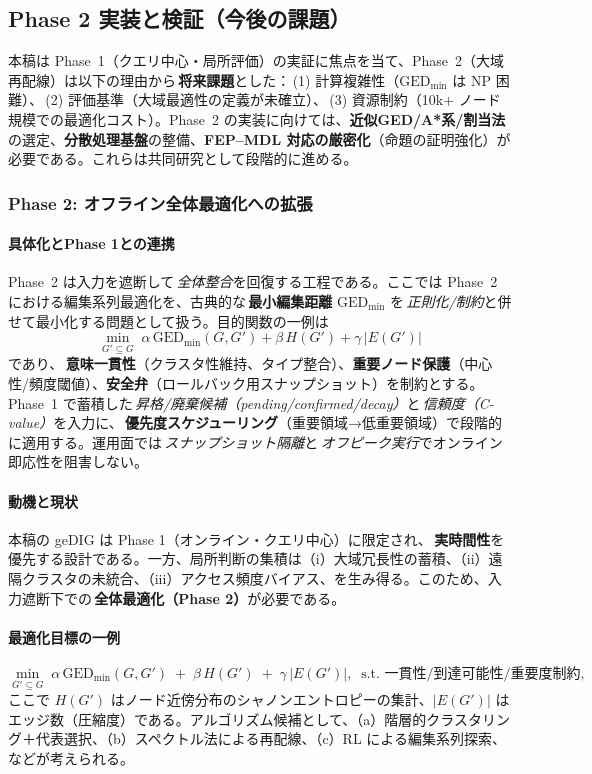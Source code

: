\documentclass[ja=standard,xelatex]{bxjsarticle}
\begin{document}
\subsection{Phase 2 実装と検証（今後の課題）}
本稿は Phase~1（クエリ中心・局所評価）の実証に焦点を当て、Phase~2（大域再配線）は以下の理由から\,\textbf{将来課題}とした：\,(1) 計算複雑性（$\mathrm{GED}_{\min}$ は NP 困難）、\,(2) 評価基準（大域最適性の定義が未確立）、\,(3) 資源制約（10k+ ノード規模での最適化コスト）。Phase~2 の実装に向けては、\textbf{近似GED/A*系/割当法}の選定、\textbf{分散処理基盤}の整備、\textbf{FEP–MDL 対応の厳密化}（命題の証明強化）が必要である。これらは共同研究として段階的に進める。

\subsubsection{Phase 2: オフライン全体最適化への拡張}
\label{sec:phase2_offline}
\paragraph{具体化とPhase 1との連携}
Phase~2 は入力を遮断して\,\emph{全体整合}を回復する工程である。ここでは Phase~2 における編集系列最適化を、古典的な\,\textbf{最小編集距離} $\mathrm{GED}_{\min}$ を\,\emph{正則化/制約}と併せて最小化する問題として扱う。目的関数の一例は
\[\min_{G'\subseteq G}\; \alpha\,\mathrm{GED}_{\min}(G,G')+\beta\,H(G')+\gamma\,|E(G')|\]
であり、\,\textbf{意味一貫性}（クラスタ性維持、タイプ整合）、\textbf{重要ノード保護}（中心性/頻度閾値）、\textbf{安全弁}（ロールバック用スナップショット）を制約とする。Phase~1 で蓄積した\,\emph{昇格/廃棄候補（pending/confirmed/decay）}と\,\emph{信頼度（C-value）}を入力に、\,\textbf{優先度スケジューリング}（重要領域→低重要領域）で段階的に適用する。運用面では\,\emph{スナップショット隔離}と\,\emph{オフピーク実行}でオンライン即応性を阻害しない。

\paragraph{動機と現状}
本稿の geDIG は Phase 1（オンライン・クエリ中心）に限定され、\,\textbf{実時間性}を優先する設計である。一方、局所判断の集積は（i）大域冗長性の蓄積、（ii）遠隔クラスタの未統合、（iii）アクセス頻度バイアス、を生み得る。このため、入力遮断下での\,\textbf{全体最適化（Phase 2）}が必要である。

\paragraph{最適化目標の一例}
\begin{equation}
  \min_{G'\subseteq G}\; \alpha\,\mathrm{GED}_{\min}(G,G')\;+\;\beta\,H(G')\;+\;\gamma\,|E(G')|,\;\; \text{s.t. 一貫性/到達可能性/重要度制約},\label{eq:phase2_obj}
\end{equation}
ここで $H(G')$ はノード近傍分布のシャノンエントロピーの集計、$|E(G')|$ はエッジ数（圧縮度）である。アルゴリズム候補として、（a）階層的クラスタリング＋代表選択、（b）スペクトル法による再配線、（c）RL による編集系列探索、などが考えられる。
\end{document}
